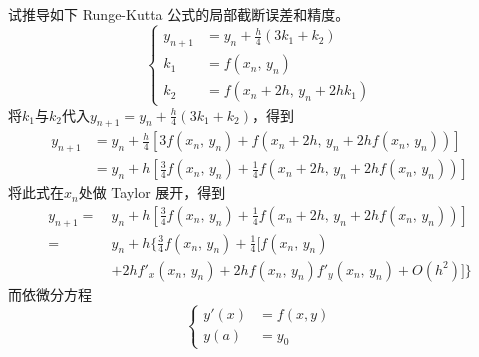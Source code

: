 \documentclass[11pt]{article}
\begin{document}
\maketitle

\thispagestyle{empty}

\newpage

\begin{question}

    \questiontext
    {
        试推导如下 Runge-Kutta 公式的局部截断误差和精度。
        \begin{equation*}
            \left\{
            \begin{aligned}
                y_{n + 1} & = y_{n} + \frac{h}{4}(3k_{1} + k_{2}) \\
                k_{1}     & = f(x_{n},\, y_{n})                   \\
                k_{2}     & = f(x_{n} + 2h,\, y_{n} + 2hk_{1})
            \end{aligned}
            \right.
        \end{equation*}
    }
    \answer
    {
        将$k_{1}$与$k_{2}$代入$ y_{n + 1} = y_{n} + \displaystyle \frac{h}{4}(3k_{1} + k_{2})$，得到
        \begin{align*}
            y_{n + 1} & = y_{n} + \frac{h}{4}\left[3f(x_{n},\, y_{n}) + f(x_{n} + 2h,\, y_{n} + 2hf(x_{n},\, y_{n}))\right]            \\
                      & = y_{n} + h\left[\frac{3}{4}f(x_{n},\, y_{n}) + \frac{1}{4}f(x_{n} + 2h,\, y_{n} + 2hf(x_{n},\, y_{n}))\right]
        \end{align*}
        将此式在$x_{n}$处做 Taylor 展开，得到
        \begin{align*}
            y_{n + 1} =\  & y_{n} + h\left[\frac{3}{4}f(x_{n},\, y_{n}) + \frac{1}{4}f(x_{n} + 2h,\, y_{n} + 2hf(x_{n},\, y_{n}))\right] \\
            =\            & y_{n} + h\bigg\{\frac{3}{4}f(x_{n},\, y_{n}) + \frac{1}{4}\big[f(x_{n},\, y_{n})                             \\
                          & + 2hf'_x(x_{n},\, y_{n}) + 2hf(x_{n},\, y_{n})f'_y(x_{n},\, y_{n}) + O(h^2)\big]\bigg\}
        \end{align*}
        而依微分方程
        \begin{equation*}
            \left\{
            \begin{aligned}
                y'(x) & = f(x, y) \\
                y(a)  & = y_0
            \end{aligned}

\end{equation*}}
\end{question}
\end{document}
